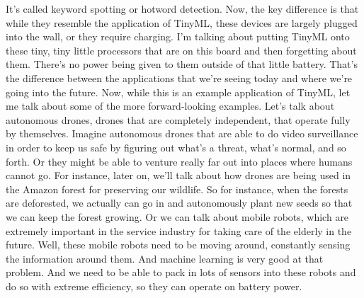 It's called keyword spotting or hotword detection.
Now, the key difference is that while they resemble the application of TinyML, these devices are largely plugged into the wall, or they require charging.
I'm talking about putting TinyML onto these tiny, tiny little processors that are on this board and then forgetting about them.
There's no power being given to them outside of that little battery.
That's the difference between the applications that we're seeing today and where we're going into the future.
Now, while this is an example application of TinyML, let me talk about some of the more forward-looking examples.
Let's talk about autonomous drones, drones that are completely independent, that operate fully by themselves.
Imagine autonomous drones that are able to do video surveillance in order to keep us safe by figuring out what's a threat, what's normal, and so forth.
Or they might be able to venture really far out into places where humans cannot go.
For instance, later on, we'll talk about how drones are being used in the Amazon forest for preserving our wildlife.
So for instance, when the forests are deforested, we actually can go in and autonomously plant new seeds so that we can keep the forest growing.
Or we can talk about mobile robots, which are extremely important in the service industry for taking care of the elderly in the future.
Well, these mobile robots need to be moving around, constantly sensing the information around them.
And machine learning is very good at that problem.
And we need to be able to pack in lots of sensors into these robots and do so with extreme efficiency, so they can operate on battery power.

